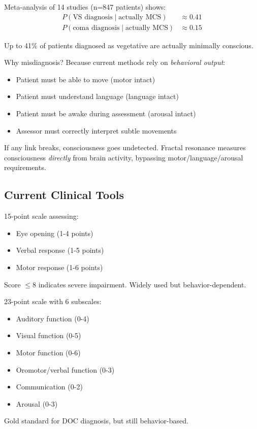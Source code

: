 \begin{theorem}\label{thm:misdiagnosis}
Meta-analysis of 14 studies (n=847 patients) shows\cite{schnakers2009}:
\begin{align}
P(\text{VS diagnosis} \mid \text{actually MCS}) &\approx 0.41 \\
P(\text{coma diagnosis} \mid \text{actually MCS}) &\approx 0.15
\end{align}

Up to 41\% of patients diagnosed as vegetative are actually minimally conscious.
\end{theorem}

\begin{keyidea}
Why misdiagnosis? Because current methods rely on \textit{behavioral output}:
\begin{itemize}
\item Patient must be able to move (motor intact)
\item Patient must understand language (language intact)
\item Patient must be awake during assessment (arousal intact)
\item Assessor must correctly interpret subtle movements
\end{itemize}

If any link breaks, consciousness goes undetected. Fractal resonance measures consciousness \textit{directly} from brain activity, bypassing motor/language/arousal requirements.
\end{keyidea}

\subsection{Current Clinical Tools}

\begin{defn}\label{def:gcs}
15-point scale assessing:
\begin{itemize}
\item Eye opening (1-4 points)
\item Verbal response (1-5 points)
\item Motor response (1-6 points)
\end{itemize}
Score $\leq 8$ indicates severe impairment. Widely used but behavior-dependent\cite{teasdale1974}.
\end{defn}

\begin{defn}\label{def:crsr}
23-point scale with 6 subscales:
\begin{itemize}
\item Auditory function (0-4)
\item Visual function (0-5)
\item Motor function (0-6)
\item Oromotor/verbal function (0-3)
\item Communication (0-2)
\item Arousal (0-3)
\end{itemize}

Gold standard for DOC diagnosis, but still behavior-based\cite{giacino2004}.
\end{defn}

